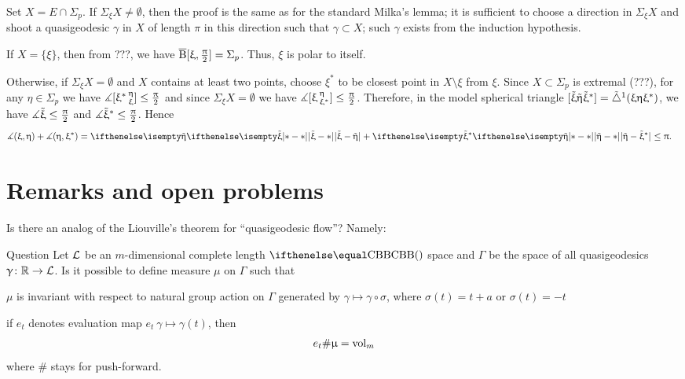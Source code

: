 Set $X=E\cap \Sigma_p$.
If $\Sigma_\xi X\not=\emptyset$, then the proof is the same as for the standard Milka's lemma; it is sufficient to choose a direction in $\Sigma_\xi X$ and shoot a quasigeodesic $\gamma$ in $X$ of length $\pi$ in this direction such that $\gamma\subset X$;
such $\gamma$ exists from the induction hypothesis. 

If $X=\{\xi\}$, then from ???, we have $\overline{\mathrm{B}}{}[\upxi,{\tfrac{\uppi}2}]=\Sigma_p$. 
Thus, $\xi$ is polar to itself.

Otherwise, if $\Sigma_\xi X=\emptyset$ and $X$ contains at least two points, choose $\xi^*$ to be closest point in $X\setminus\xi$ from $\xi$. 
Since $X\subset \Sigma_p$ is extremal (???), for any $\eta\in \Sigma_p$ we have $\mangle\hinge{\xi^*}\eta\xi\le\tfrac\pi2$ and since $\Sigma_\xi X=\emptyset$ we have $\mangle\hinge\xi\eta{\xi^*}\le\tfrac\pi2$.
Therefore, in the model spherical triangle 
$[{\tilde {\upxi}}{\tilde {\upeta}}{\tilde {\upxi}^*}]
=
{\tilde\triangle}^{1}(\upxi\upeta\upxi^*)$, 
we have $\mangle\tilde \xi\le \tfrac\pi2$ 
and $\mangle\tilde \xi^*\le \tfrac\pi2$.
Hence 
\begin{align*}
\mangle(\xi,\eta)+\mangle(\eta,\xi^*)
&=\dist{\tilde \xi}{\tilde \eta}{}+\dist{\tilde \eta}{\tilde \xi^*}{}
\le\pi.
\end{align*}
\qedsf







\section{Remarks and open problems}
Is there an analog of the Liouville's theorem for ``quasigeodesic flow''?
Namely:
\begin{thm}{Question}
Let $\mathcal{L}$  be an $m$-dimensional complete length $\Alex{}$ space
and $\Gamma$ be the space of all quasigeodesics $\gamma\:\RR\to \spc{L}$.
Is it possible to define measure $\mu$ on $\Gamma$ such that 
\begin{subthm}{}
$\mu$ is invariant with respect to natural group action on $\Gamma$ generated by $\gamma\mapsto\gamma\circ\sigma$, where $\sigma(t)=t+a$ or $\sigma(t)=-t$
\end{subthm}

\begin{subthm}{}
if $e_t$ denotes evaluation map $e_t\:\gamma\mapsto\gamma(t)$, then 
\[e_t\#\upmu=\mathop{\rm vol}\nolimits_m\]
where $\#$ stays for push-forward.
\end{subthm}
\end{thm}

